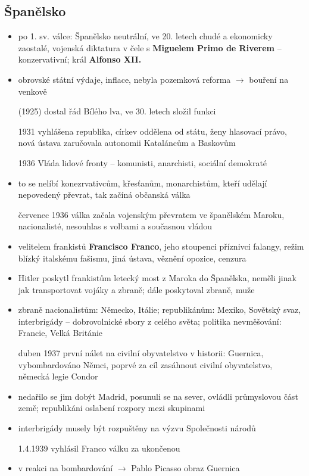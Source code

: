 \documentclass{article}
\begin{document}
\subsection*{Španělsko}
\begin{itemize}
    \item po 1. sv. válce: Španělsko neutrální, ve 20. letech chudé a ekonomicky zaostalé, vojenská diktatura v čele s \textbf{Miguelem Primo de Riverem} -- konzervativní; král \textbf{Alfonso XII.}
    \item obrovské státní výdaje, inflace, nebyla pozemková reforma $\rightarrow$ bouření na venkově
    \item[(1925)] dostal řád Bílého lva, ve 30. letech složil funkci
    \item[1931] vyhlášena republika, církev oddělena od státu, ženy hlasovací právo, nová ústava zaručovala autonomii Kataláncům a Baskovům
    \item[1936] Vláda lidové fronty -- komunisti, anarchisti, sociální demokraté
    \item to se nelíbí konezrvativcům, křesťanům, monarchistům, kteří udělají nepovedený převrat, tak začíná občanská válka
    \item[červenec 1936] válka začala vojenským převratem ve španělském Maroku, nacionalisté, nesouhlas s volbami a současnou vládou
    \item velitelem frankistů \textbf{Francisco Franco}, jeho stoupenci příznivci falangy, režim blízký italskému fašismu, jiná ústava, věznění opozice, cenzura
    \item Hitler poskytl frankistům letecký most z Maroka do Španělska, neměli jinak jak transportovat vojáky a zbraně; dále poskytoval zbraně, muže
    \item zbraně nacionalistům: Německo, Itálie; republikánům: Mexiko, Sovětský svaz, interbrigády -- dobrovolnické sbory z celého světa; politika nevměšování: Francie, Velká Británie
    \item[duben 1937] první nálet na civilní obyvatelstvo v historii: Guernica, vybombardováno Němci, poprvé za cíl zasáhnout civilní obyvatelstvo, německá legie Condor
    \item nedařilo se jim dobýt Madrid, posunuli se na sever, ovládli průmyslovou část země; republikáni oslabení rozpory mezi skupinami
    \item interbrigády musely být rozpuštěny na výzvu Společnosti národů
    \item[1.4.1939] vyhlásil Franco válku za ukončenou
    \item v reakci na bombardování $\rightarrow$ Pablo Picasso obraz Guernica
\end{itemize}
\end{document}
